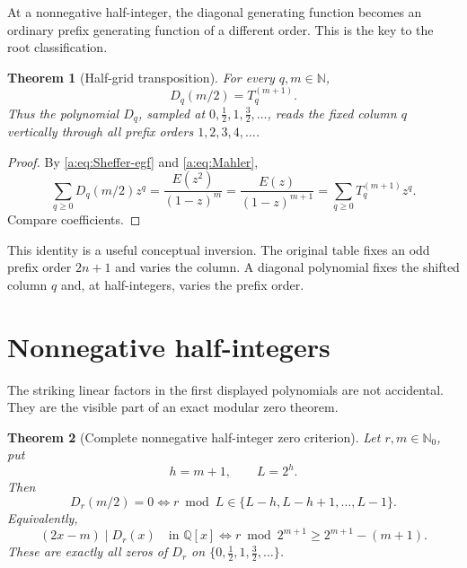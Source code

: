 \documentclass[11pt,a4paper,oneside,openany]{book}
\numberwithin{equation}{chapter}
\newtheorem{theorem}{Theorem}[chapter]
\theoremstyle{definition}
\theoremstyle{remark}
\newcommand{\N}{\mathbb N}
\newcommand{\Nzero}{\mathbb N_0}
\newcommand{\Q}{\mathbb Q}
\newcommand{\K}{E}
\newcommand{\Diag}{D}
\begin{document}
At a nonnegative half-integer, the diagonal generating function becomes an
ordinary prefix generating function of a different order.  This is the key
to the root classification.

\begin{theorem}[Half-grid transposition]\label{c:thm:transposition}
For every \(q,m\in\N\),
\begin{equation}
 \boxed{\Diag_q(m/2)=T_{q}^{(m+1)}.}                     \label{c:eq:transposition}
\end{equation}
Thus the polynomial \(\Diag_q\), sampled at
\(0,\tfrac12,1,\tfrac32,\ldots\), reads the fixed column \(q\) vertically
through all prefix orders \(1,2,3,4,\ldots\).
\end{theorem}

\begin{proof}
By \cref{a:eq:Sheffer-egf} and \cref{a:eq:Mahler},
\[
 \sum_{q\geq0}\Diag_q(m/2)z^q
 =\frac{\K(z^2)}{(1-z)^m}
 =\frac{\K(z)}{(1-z)^{m+1}}
 =\sum_{q\geq0}T_{q}^{(m+1)}z^q.
\]
Compare coefficients.
\end{proof}

This identity is a useful conceptual inversion.  The original table fixes an
odd prefix order \(2n+1\) and varies the column.  A diagonal polynomial fixes
the shifted column \(q\) and, at half-integers, varies the prefix order.
\section{Nonnegative half-integers}

The striking linear factors in the first displayed polynomials are not
accidental.  They are the visible part of an exact modular zero theorem.

\begin{theorem}[Complete nonnegative half-integer zero criterion]\label{a:thm:half-root}
Let \(r,m\in\Nzero\), put
\begin{equation}
 h=m+1,
 \qquad
 L=2^h.
 \label{a:eq:half-root-hL}
\end{equation}
Then
\begin{equation}
 \boxed{
 \Diag_r(m/2)=0
 \iff
 r\bmod L\in\{L-h,L-h+1,\ldots,L-1\}.}
 \label{a:eq:half-root-criterion}
\end{equation}
Equivalently,
\begin{equation}
 (2x-m)\mid\Diag_r(x)\quad\text{in }\Q[x]
 \iff
 r\bmod 2^{m+1}\ge2^{m+1}-(m+1).
 \label{a:eq:factor-criterion}
\end{equation}
These are exactly all zeros of \(\Diag_r\) on
\(\{0,\tfrac12,1,\tfrac32,\ldots\}\).
\end{theorem}
\end{document}
